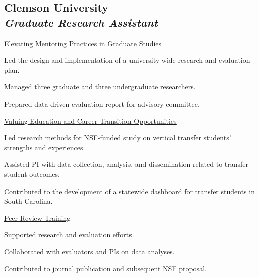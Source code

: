 
\subsection{\textbf{Clemson University} \\
\textit{Graduate Research Assistant}}
\begin{cvtable}
        {\color{cvsectioncolor}\href{https://www.nsf.gov/awardsearch/showAward?AWD_ID=2429719&HistoricalAwards=false}{\underline{Elevating Mentoring Practices in Graduate Studies}}}
        {}
        {\begin{tightitemize}
            \item Led the design and implementation of a university-wide research and evaluation plan.
            \item Managed three graduate and three undergraduate researchers.
            \item Prepared data-driven evaluation report for advisory committee.
        \end{tightitemize}}
        {\color{cvsectioncolor}\href{https://www.nsf.gov/awardsearch/showAward?AWD_ID=2144213&HistoricalAwards=false}{\underline{Valuing Education and Career Transition Opportunities}}}
        {}
        {\begin{tightitemize}
            \item Led research methods for NSF-funded study on vertical transfer students' strengths and experiences.
            \item Assisted PI with data collection, analysis, and dissemination related to transfer student outcomes.
            \item Contributed to the development of a statewide dashboard for transfer students in South Carolina.
        \end{tightitemize}}
        {\color{cvsectioncolor}\href{https://www.nsf.gov/awardsearch/showAward?AWD_ID=2037807&HistoricalAwards=false}{\underline{Peer Review Training}}}
        {}
        {\begin{tightitemize}
            \item Supported research and evaluation efforts.
            \item Collaborated with evaluators and PIs on data analyses.
            \item Contributed to journal publication and subsequent NSF proposal.
        \end{tightitemize}}
\end{cvtable}

